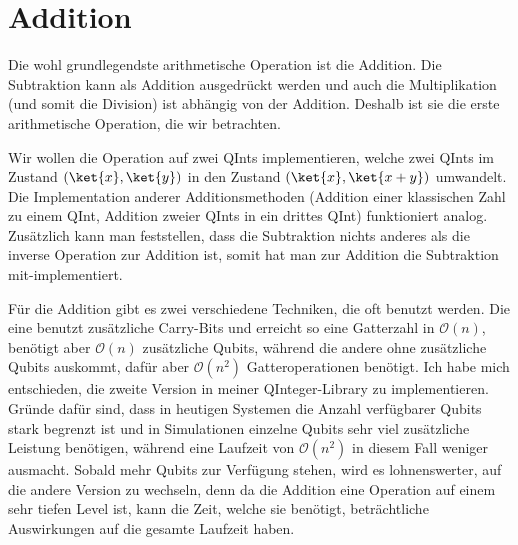 

\section{Addition}
Die wohl grundlegendste arithmetische Operation ist die Addition. Die Subtraktion kann als Addition ausgedrückt werden und auch die Multiplikation (und somit die Division) ist abhängig von der Addition. Deshalb ist sie die erste arithmetische Operation, die wir betrachten. 

Wir wollen die Operation auf zwei QInts implementieren, welche zwei QInts im Zustand $(\ket{x}, \ket{y})$ in den Zustand $(\ket{x}, \ket{x + y})$ umwandelt. Die Implementation anderer Additionsmethoden (Addition einer klassischen Zahl zu einem QInt, Addition zweier QInts in ein drittes QInt) funktioniert analog. Zusätzlich kann man feststellen, dass die Subtraktion nichts anderes als die inverse Operation zur Addition ist, somit hat man zur Addition die Subtraktion mit-implementiert.

Für die Addition gibt es zwei verschiedene Techniken, die oft benutzt werden. Die eine benutzt zusätzliche Carry-Bits und erreicht so eine Gatterzahl in $\mathcal O(n)$, benötigt aber $\mathcal O(n)$ zusätzliche Qubits, während die andere ohne zusätzliche Qubits auskommt, dafür aber $\mathcal O(n^2)$ Gatteroperationen benötigt. Ich habe mich entschieden, die zweite Version in meiner QInteger-Library zu implementieren. Gründe dafür sind, dass in heutigen Systemen die Anzahl verfügbarer Qubits stark begrenzt ist und in Simulationen einzelne Qubits sehr viel zusätzliche Leistung benötigen, während eine Laufzeit von $\mathcal O(n^2)$ in diesem Fall weniger ausmacht. Sobald mehr Qubits zur Verfügung stehen, wird es lohnenswerter, auf die andere Version zu wechseln, denn da die Addition eine Operation auf einem sehr tiefen Level ist, kann die Zeit, welche sie benötigt, beträchtliche Auswirkungen auf die gesamte Laufzeit haben.

